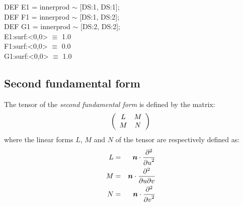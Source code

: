 \documentclass{31x47jw}
\begin{document}
\begin{script}
\begin{smallplasm}
DEF E1 = innerprod $\sim$ [DS:1, DS:1];\\
DEF F1 = innerprod $\sim$ [DS:1, DS:2];\\
DEF G1 = innerprod $\sim$ [DS:2, DS:2];\\[0.3cm]

E1:surf:<0,0> $\equiv$ 1.0\\
F1:surf:<0,0> $\equiv$ 0.0\\
G1:surf:<0,0> $\equiv$ 1.0
\end{smallplasm}
\label{script:5:form1}
\end{script}



\subsection{Second fundamental form}

The tensor of the \emph{second fundamental form} is defined by the 
matrix:
\[
{\left(\begin{array}{cccccccc}
L & M\\M & N
\end{array}\right)}
\]
where the linear forms $L$, $M$ and $N$ of the tensor are respectively
defined as:
\begin{eqnarray*}
L &=& {\mbox{\boldmath $n$}}\cdot {\partial^{2} \over{ \partial u}^{2}}\\
M &=& {\mbox{\boldmath $n$}}\cdot {\partial^{2} \over{ \partial u}{ \partial v}}\\
N &=& {\mbox{\boldmath $n$}}\cdot {\partial^{2} \over{ \partial v}^{2}}
\end{eqnarray*}
\end{document}
